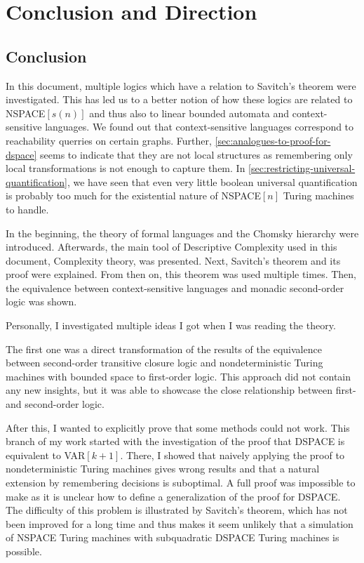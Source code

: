 
\chapter{Conclusion and Direction}\label{ch:conclusion-and-direction}

\section{Conclusion}\label{sec:conclusion}
In this document, multiple logics which have a relation to Savitch's theorem were investigated.
This has led us to a better notion of how these logics are related to \acs{NSPACE}$[s(n)]$ and thus also to linear bounded automata and context-sensitive languages.
We found out that context-sensitive languages correspond to reachability querries on certain graphs.
Further, \cref{sec:analogues-to-proof-for-dspace} seems to indicate that they are not local structures as remembering only local transformations is not enough to capture them.
In \cref{sec:restricting-universal-quantification}, we have seen that even very little boolean universal quantification is probably too much for the existential nature of \acs{NSPACE}$[n]$ Turing machines to handle.

In the beginning, the theory of formal languages and the Chomsky hierarchy were introduced.
Afterwards, the main tool of Descriptive Complexity used in this document, Complexity theory, was presented.
Next, Savitch's theorem and its proof were explained.
From then on, this theorem was used multiple times.
Then, the equivalence between context-sensitive languages and monadic second-order logic was shown.

Personally, I investigated multiple ideas I got when I was reading the theory.

The first one was a direct transformation of the results of the equivalence between second-order transitive closure logic and nondeterministic Turing machines with bounded space to first-order logic.
This approach did not contain any new insights, but it was able to showcase the close relationship between first- and second-order logic.

After this, I wanted to explicitly prove that some methods could not work.
This branch of my work started with the investigation of the proof that \acs{DSPACE} is equivalent to \acs{VAR}$[k + 1]$.
There, I showed that naively applying the proof to nondeterministic Turing machines gives wrong results and that a natural extension by remembering decisions is suboptimal.
A full proof was impossible to make as it is unclear how to define a generalization of the proof for \acs{DSPACE}\@.
The difficulty of this problem is illustrated by Savitch's theorem, which has not been improved for a long time and thus makes it seem unlikely that a simulation of \acs{NSPACE} Turing machines with subquadratic \acs{DSPACE} Turing machines is possible.

